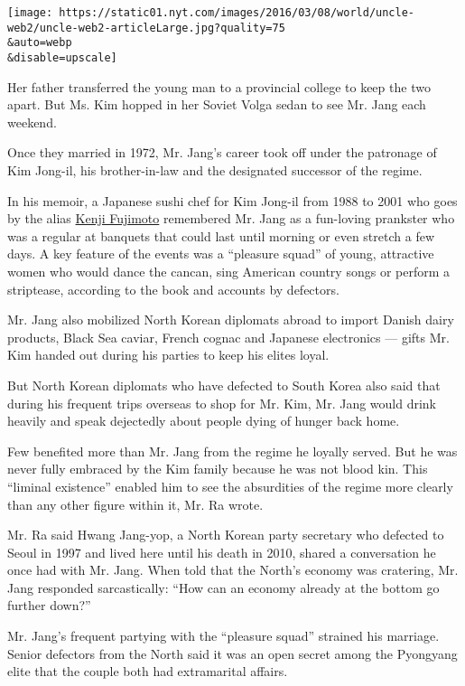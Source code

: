 \texttt{[image: https://static01.nyt.com/images/2016/03/08/world/uncle-web2/uncle-web2-articleLarge.jpg?quality=75\\\&auto=webp\\\&disable=upscale]}

Her father transferred the young man to a provincial college to keep the
two apart. But Ms. Kim hopped in her Soviet Volga sedan to see Mr. Jang
each weekend.

Once they married in 1972, Mr. Jang's career took off under the
patronage of Kim Jong-il, his brother-in-law and the designated
successor of the regime.

In his memoir, a Japanese sushi chef for Kim Jong-il from 1988 to 2001
who goes by the alias
\href{http://www.nytimes.com/2012/08/25/world/asia/kim-family-chefs-redemption-suggests-a-softening-north-korea.html}{Kenji
Fujimoto} remembered Mr. Jang as a fun-loving prankster who was a
regular at banquets that could last until morning or even stretch a few
days. A key feature of the events was a ``pleasure squad'' of young,
attractive women who would dance the cancan, sing American country songs
or perform a striptease, according to the book and accounts by
defectors.

Mr. Jang also mobilized North Korean diplomats abroad to import Danish
dairy products, Black Sea caviar, French cognac and Japanese electronics
--- gifts Mr. Kim handed out during his parties to keep his elites
loyal.

But North Korean diplomats who have defected to South Korea also said
that during his frequent trips overseas to shop for Mr. Kim, Mr. Jang
would drink heavily and speak dejectedly about people dying of hunger
back home.

Few benefited more than Mr. Jang from the regime he loyally served. But
he was never fully embraced by the Kim family because he was not blood
kin. This ``liminal existence'' enabled him to see the absurdities of
the regime more clearly than any other figure within it, Mr. Ra wrote.

Mr. Ra said Hwang Jang-yop, a North Korean party secretary who defected
to Seoul in 1997 and lived here until his death in 2010, shared a
conversation he once had with Mr. Jang. When told that the North's
economy was cratering, Mr. Jang responded sarcastically: ``How can an
economy already at the bottom go further down?''

Mr. Jang's frequent partying with the ``pleasure squad'' strained his
marriage. Senior defectors from the North said it was an open secret
among the Pyongyang elite that the couple both had extramarital affairs.

